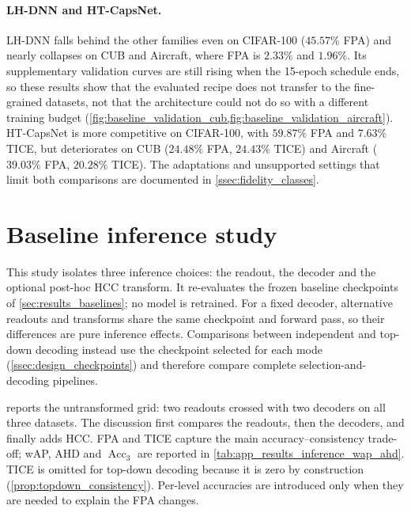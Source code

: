 \paragraph{LH-DNN and HT-CapsNet.} LH-DNN falls behind the other families even
on CIFAR-100 ($45.57\%$ FPA) and nearly collapses on CUB and Aircraft, where FPA
is $2.33\%$ and $1.96\%$. Its supplementary validation curves are still rising
when the 15-epoch schedule ends, so these results show that the evaluated recipe
does not transfer to the fine-grained datasets, not that the architecture could
not do so with a different training budget
(\cref{fig:baseline_validation_cub,fig:baseline_validation_aircraft}).
HT-CapsNet is more competitive on CIFAR-100, with $59.87\%$ FPA and $7.63\%$
TICE, but deteriorates on CUB ($24.48\%$ FPA, $24.43\%$ TICE) and Aircraft
($39.03\%$ FPA, $20.28\%$ TICE). The adaptations and unsupported settings that
limit both comparisons are documented in \cref{ssec:fidelity_classes}.

\FloatBarrier


\section{Baseline inference study}
\label{sec:results_inference}

This study isolates three inference choices: the readout, the decoder and the
optional post-hoc HCC transform. It re-evaluates the frozen baseline checkpoints
of \cref{sec:results_baselines}; no model is retrained.
For a fixed decoder, alternative readouts and transforms share the same
checkpoint and forward pass, so their differences are pure inference effects.
Comparisons between independent and top-down decoding instead use the checkpoint
selected for each mode (\cref{ssec:design_checkpoints}) and therefore compare
complete selection-and-decoding pipelines.

 reports the untransformed grid: two readouts
crossed with two decoders on all three datasets. The discussion first compares
the readouts, then the decoders, and finally adds HCC. FPA and TICE capture the
main accuracy--consistency trade-off; wAP, AHD and $\operatorname{Acc}_3$ are reported in
\cref{tab:app_results_inference_wap_ahd}. TICE is omitted for top-down decoding
because it is zero by construction (\cref{prop:topdown_consistency}). Per-level
accuracies are introduced only when they are needed to explain the FPA changes.

